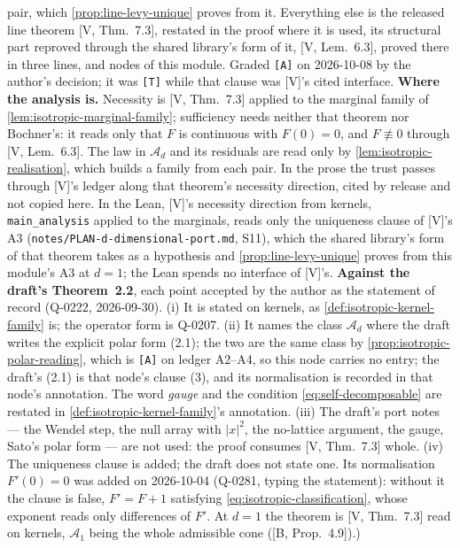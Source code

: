 \begin{theorem}
{pair, which \ref{prop:line-levy-unique} proves from it. Everything else is the released line theorem
[V, Thm.~7.3], restated in the proof where it is used, its structural part reproved through the
shared library's form of it, [V, Lem.~6.3], proved there in three lines, and nodes of this module.
Graded \texttt{[A]} on 2026-10-08 by the author's decision; it was \texttt{[T]} while that clause was
[V]'s cited interface. \textbf{Where the analysis is.} Necessity is [V, Thm.~7.3] applied to the marginal family of
\ref{lem:isotropic-marginal-family}; sufficiency needs neither that theorem nor Bochner's: it reads
only that $F$ is continuous with $F(0) = 0$, and $F \not\equiv 0$ through [V, Lem.~6.3]. The law
in $\mathcal{A}_d$ and its residuals are read only by \ref{lem:isotropic-realisation}, which builds
a family from each pair. In the prose the trust passes through [V]'s ledger along that theorem's
necessity direction, cited by release and not copied here. In the Lean, [V]'s necessity direction from kernels, \texttt{main\_analysis}
applied to the marginals, reads only the uniqueness clause of [V]'s A3
(\texttt{notes/PLAN-d-dimensional-port.md}, S11), which the shared library's form of that theorem
takes as a hypothesis and \ref{prop:line-levy-unique} proves from this module's A3 at $d = 1$; the
Lean spends no interface of [V]'s. \textbf{Against the draft's Theorem~2.2}, each point accepted by the author as the statement of
record (Q-0222, 2026-09-30). (i) It is stated on kernels, as
\ref{def:isotropic-kernel-family} is; the operator form is Q-0207. (ii) It names the class
$\mathcal{A}_d$ where the draft writes the explicit polar form (2.1); the two are the same class by
\ref{prop:isotropic-polar-reading}, which is \texttt{[A]} on ledger A2--A4, so this node carries no
entry; the draft's (2.1) is that node's clause (3), and its normalisation is recorded in that
node's annotation. The word \emph{gauge} and the condition \ref{eq:self-decomposable} are restated
in \ref{def:isotropic-kernel-family}'s annotation. (iii) The draft's port
notes --- the Wendel step, the null array with $|x|^2$, the no-lattice argument, the gauge, Sato's
polar form --- are not used: the proof consumes [V, Thm.~7.3] whole. (iv) The uniqueness clause is
added; the draft does not state one. Its normalisation $F'(0) = 0$ was added on 2026-10-04 (Q-0281,
typing the statement): without it the clause is false, $F' = F + 1$ satisfying
\ref{eq:isotropic-classification}, whose exponent reads only differences of $F'$. At $d = 1$ the theorem is [V, Thm.~7.3] read on kernels,
$\mathcal{A}_1$ being the whole admissible cone ([B, Prop.~4.9]).)}
\end{theorem}

